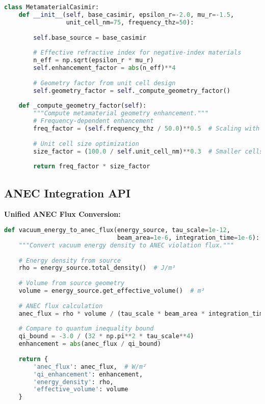 \documentclass[11pt]{article}
\begin{document}
\begin{lstlisting}[language=Python]
class MetamaterialCasimir:
    def __init__(self, base_casimir, epsilon_r=-2.0, mu_r=-1.5,
                 unit_cell_nm=75, frequency_thz=50):
        
        self.base_source = base_casimir
        
        # Effective refractive index for negative-index materials
        n_eff = np.sqrt(epsilon_r * mu_r)
        self.enhancement_factor = abs(n_eff)**4
        
        # Geometry factor from unit cell design
        self.geometry_factor = self._compute_geometry_factor()
        
    def _compute_geometry_factor(self):
        """Compute metamaterial geometry enhancement."""
        # Frequency-dependent enhancement
        freq_factor = (self.frequency_thz / 50.0)**0.5  # Scaling with frequency
        
        # Unit cell size optimization
        size_factor = (100.0 / self.unit_cell_nm)**0.3  # Smaller cells better
        
        return freq_factor * size_factor
\end{lstlisting}

\subsection{ANEC Integration API}

\textbf{Unified ANEC Flux Conversion:}
\begin{lstlisting}[language=Python]
def vacuum_energy_to_anec_flux(energy_source, tau_scale=1e-12, 
                               beam_area=1e-6, integration_time=1e-6):
    """Convert vacuum energy density to ANEC violation flux."""
    
    # Energy density from source
    rho = energy_source.total_density()  # J/m³
    
    # Volume from source geometry
    volume = energy_source.get_effective_volume()  # m³
    
    # ANEC flux calculation
    anec_flux = rho * volume / (tau_scale * beam_area * integration_time)
    
    # Compare to quantum inequality bound
    qi_bound = -3.0 / (32 * np.pi**2 * tau_scale**4)
    enhancement = abs(anec_flux / qi_bound)
    
    return {
        'anec_flux': anec_flux,  # W/m²
        'qi_enhancement': enhancement,
        'energy_density': rho,
        'effective_volume': volume
    }
\end{lstlisting}
\end{document}
